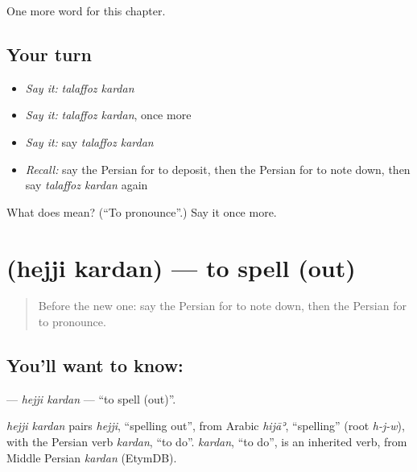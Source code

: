 \begin{grammarlens}[title={What you've built}]
One more word for this chapter.
\end{grammarlens}

\subsection*{Your turn}
\begin{itemize}
\raggedright
  \item \emph{Say it:} \emph{talaffoz kardan}
  \item \emph{Say it:} \emph{talaffoz kardan}, once more
  \item \emph{Say it:} say \emph{talaffoz kardan}
  \item \emph{Recall:} say the Persian for to deposit, then the Persian for to note down, then say \emph{talaffoz kardan} again
\end{itemize}

\begin{tcolorbox}[breakable,colback=teal!4,colframe=teal!35!black,title={Before you move on}]
What does   mean? (\textquotedblleft{}To pronounce\textquotedblright{}.) Say it once more.
\end{tcolorbox}
\section[\texorpdfstring{\fa{هجی} \fa{کردن} (hejji kardan)}{هجی کردن (hejji kardan)}]{  (hejji kardan) — to spell (out)}

\label{lesson:FA-C188-hejji-kardan}



\begin{quote}
Before the new one: say the Persian for to note down, then the Persian for to pronounce.
\end{quote}

\subsection*{You'll want to know:  }
\textbf{ } — \emph{hejji kardan} — \textquotedblleft{}to spell (out)\textquotedblright{}.

\begin{cousinweb}
\emph{hejji kardan} pairs \emph{hejji}, \textquotedblleft{}spelling out\textquotedblright{}, from Arabic \emph{hijāʾ}, \textquotedblleft{}spelling\textquotedblright{} (root \emph{h-j-w}), with the Persian verb \emph{kardan}, \textquotedblleft{}to do\textquotedblright{}. \emph{kardan}, \textquotedblleft{}to do\textquotedblright{}, is an inherited verb, from Middle Persian \emph{kardan} (EtymDB).
\end{cousinweb}

